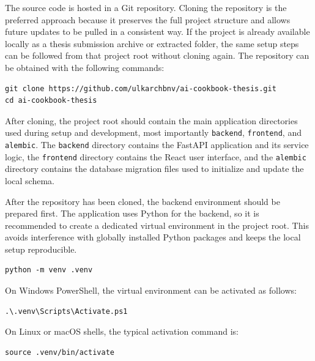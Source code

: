The source code is hosted in a Git repository. Cloning the repository
is the preferred approach because it preserves the full project
structure and allows future updates to be pulled in a consistent way.
If the project is already available locally as a thesis submission
archive or extracted folder, the same setup steps can be followed from
that project root without cloning again.
The repository can be obtained with the following commands:

\begin{lstlisting}
git clone https://github.com/ulkarchbnv/ai-cookbook-thesis.git
cd ai-cookbook-thesis
\end{lstlisting}

After cloning, the project root should contain the main application
directories used during setup and development, most importantly
\texttt{backend}, \texttt{frontend}, and \texttt{alembic}. The
\texttt{backend} directory contains the FastAPI application and its
service logic, the \texttt{frontend} directory contains the React user
interface, and the \texttt{alembic} directory contains the database
migration files used to initialize and update the local schema.

After the repository has been cloned, the backend environment should
be prepared first. The application uses Python for the backend, so it
is recommended to create a dedicated virtual environment in the
project root. This avoids interference with globally installed Python
packages and keeps the local setup reproducible.

\begin{lstlisting}
python -m venv .venv
\end{lstlisting}

On Windows PowerShell, the virtual environment can be activated as
follows:

\begin{lstlisting}
.\.venv\Scripts\Activate.ps1
\end{lstlisting}

On Linux or macOS shells, the typical activation command is:

\begin{lstlisting}
source .venv/bin/activate
\end{lstlisting}


